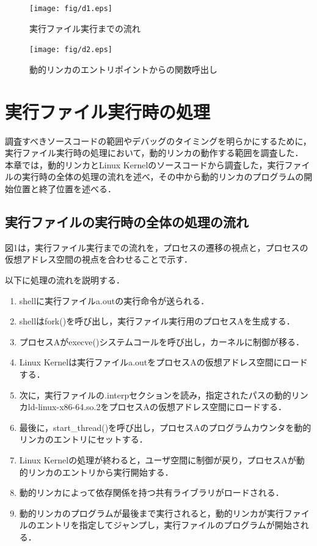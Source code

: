 \documentclass[submit,techreq,noauthor,dvipdfmx]{mid-eco}
\begin{document}
\begin{figure}[t]
	\centering
  \texttt{[image: fig/d1.eps]}
	\caption{実行ファイル実行までの流れ}
	\label{fig:d1}
\end{figure}

\begin{figure}[t]
	\centering
  \texttt{[image: fig/d2.eps]}
	\caption{動的リンカのエントリポイントからの関数呼出し}
	\label{fig:d2}
\end{figure}

\section{実行ファイル実行時の処理}
調査すべきソースコードの範囲やデバッグのタイミングを明らかにするために，実行ファイル実行時の処理において，動的リンカの動作する範囲を調査した．
本章では，動的リンカとLinux Kernelのソースコードから調査した，実行ファイルの実行時の全体の処理の流れを述べ，その中から動的リンカのプログラムの開始位置と終了位置を述べる．

\subsection{実行ファイルの実行時の全体の処理の流れ}
図1は，実行ファイル実行までの流れを，プロセスの遷移の視点と，プロセスの仮想アドレス空間の視点を合わせることで示す．

以下に処理の流れを説明する．

\begin{enumerate}
  \item shellに実行ファイルa.outの実行命令が送られる．
  \item shellはfork()を呼び出し，実行ファイル実行用のプロセスAを生成する．
  \item プロセスAがexecve()システムコールを呼び出し，カーネルに制御が移る．
  \item Linux Kernelは実行ファイルa.outをプロセスAの仮想アドレス空間にロードする．
  \item 次に，実行ファイルの.interpセクションを読み，指定されたパスの動的リンカld-linux-x86-64.so.2をプロセスAの仮想アドレス空間にロードする．　
  \item 最後に，start\_thread()を呼び出し，プロセスAのプログラムカウンタを動的リンカのエントリにセットする．
  \item Linux Kernelの処理が終わると，ユーザ空間に制御が戻り，プロセスAが動的リンカのエントリから実行開始する．
  \item 動的リンカによって依存関係を持つ共有ライブラリがロードされる．
  \item 動的リンカのプログラムが最後まで実行されると，動的リンカが実行ファイルのエントリを指定してジャンプし，実行ファイルのプログラムが開始される．\\
\end{enumerate}
\end{document}
